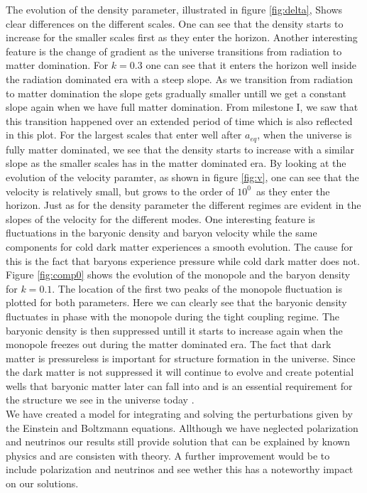 \documentclass[onecolumn]{aastex62}
\begin{document}
The evolution of the density parameter, illustrated in figure \ref{fig:delta}, Shows clear differences on the different scales. One can see that the density starts to increase for the smaller scales first as they enter the horizon. Another interesting feature is the change of gradient as the universe transitions from radiation to matter domination. For $k=0.3$ one can see that it enters the horizon well inside the radiation dominated era with a steep slope. As we transition from radiation to matter domination the slope gets gradually smaller untill we get a constant slope again when we have full matter domination. From milestone I, we saw that this transition happened over an extended period of time which is also reflected in this plot. For the largest scales that enter well after $a_{eq}$, when the universe is fully matter dominated, we see that the density starts to increase with a similar slope as the smaller scales has in the matter dominated era. By looking at the evolution of the velocity paramter, as shown in figure \ref{fig:v}, one can see that the velocity is relatively small, but grows to the order of $10^0$ as they enter the horizon. Just as for the density parameter the different regimes are evident in the slopes of the velocity for the different modes. One interesting feature is fluctuations in the baryonic density and baryon velocity while the same components for cold dark matter experiences a smooth evolution. The cause for this is the fact that baryons experience pressure while cold dark matter does not. Figure \ref{fig:comp0} shows the evolution of the monopole and the baryon density for $k=0.1$. The location of the first two peaks of the monopole fluctuation is plotted for both parameters. Here we can clearly see that the baryonic density fluctuates in phase with the monopole during the tight coupling regime. The baryonic density is then suppressed untill it starts to increase again when the monopole freezes out during the matter dominated era. The fact that dark matter is pressureless is important for structure formation in the universe. Since the dark matter is not suppressed it will continue to evolve and create potential wells that baryonic matter later can fall into and is an essential requirement for the structure we see in the universe today \citep[p.15]{Shen:2019}.\\

We have created a model for integrating and solving the perturbations given by the Einstein and Boltzmann equations. Allthough we have neglected polarization and neutrinos our results still provide solution that can be explained by known physics and are consisten with theory. A further improvement would be to include polarization and neutrinos and see wether this has a noteworthy impact on our solutions.



\end{document}
